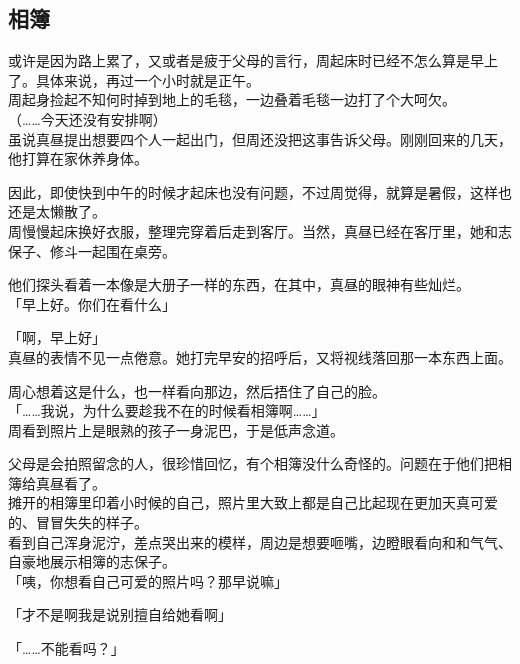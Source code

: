 \subsection{相簿}

或许是因为路上累了，又或者是疲于父母的言行，周起床时已经不怎么算是早上了。具体来说，再过一个小时就是正午。\\

周起身捡起不知何时掉到地上的毛毯，一边叠着毛毯一边打了个大呵欠。\\

（……今天还没有安排啊）\\

虽说真昼提出想要四个人一起出门，但周还没把这事告诉父母。刚刚回来的几天，他打算在家休养身体。

因此，即使快到中午的时候才起床也没有问题，不过周觉得，就算是暑假，这样也还是太懒散了。\\

周慢慢起床换好衣服，整理完穿着后走到客厅。当然，真昼已经在客厅里，她和志保子、修斗一起围在桌旁。

他们探头看着一本像是大册子一样的东西，在其中，真昼的眼神有些灿烂。\\

「早上好。你们在看什么」

「啊，早上好」\\

真昼的表情不见一点倦意。她打完早安的招呼后，又将视线落回那一本东西上面。

周心想着这是什么，也一样看向那边，然后捂住了自己的脸。\\

「……我说，为什么要趁我不在的时候看相簿啊……」\\

周看到照片上是眼熟的孩子一身泥巴，于是低声念道。

父母是会拍照留念的人，很珍惜回忆，有个相簿没什么奇怪的。问题在于他们把相簿给真昼看了。\\

摊开的相簿里印着小时候的自己，照片里大致上都是自己比起现在更加天真可爱的、冒冒失失的样子。\\

看到自己浑身泥泞，差点哭出来的模样，周边是想要咂嘴，边瞪眼看向和和气气、自豪地展示相簿的志保子。\\

「咦，你想看自己可爱的照片吗？那早说嘛」

「才不是啊我是说别擅自给她看啊」

「……不能看吗？」

